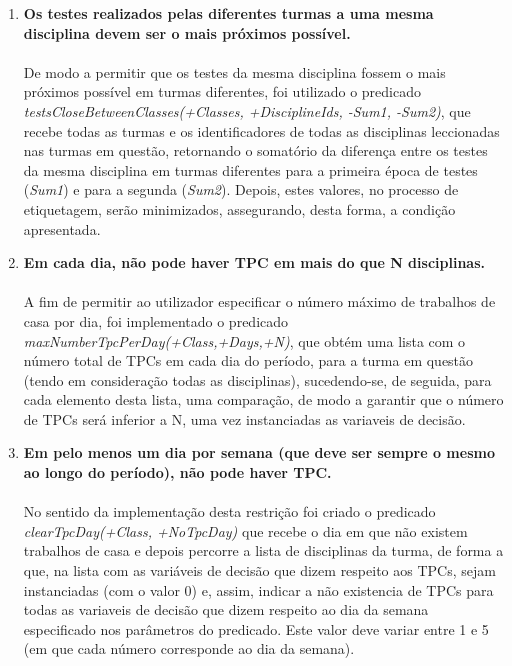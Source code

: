 \documentclass{llncs}
\begin{document}
\begin{enumerate}
	\item \textbf{Os testes realizados pelas diferentes turmas a uma mesma disciplina devem ser o mais próximos possível.} \\\\
		De modo a permitir que os testes da mesma disciplina fossem o mais próximos possível em turmas diferentes, foi utilizado o predicado  \textit{testsCloseBetweenClasses(+Classes, +DisciplineIds, -Sum1, -Sum2)}, 
		que recebe todas as turmas e os identificadores de todas as disciplinas leccionadas nas turmas em questão, retornando o somatório da diferença entre os testes da mesma disciplina em turmas diferentes para a 
		primeira época de testes (\textit{Sum1}) e para a segunda 
		(\textit{Sum2}). Depois, estes valores, no processo de etiquetagem, serão minimizados, assegurando, desta forma, a condição apresentada.
		\\

	\item \textbf{Em cada dia, não pode haver TPC em mais do que N disciplinas.} \\\\
		A fim de permitir ao utilizador especificar o número máximo de trabalhos de casa por dia, foi implementado o predicado \textit{maxNumberTpcPerDay(+Class,+Days,+N)}, que obtém uma lista com o número total de TPCs em cada dia do período, para a turma em questão (tendo em consideração todas as disciplinas), sucedendo-se, de seguida, para cada elemento desta lista, uma comparação, 
		de modo a garantir que o número de TPCs será inferior a N, uma vez instanciadas as variaveis de decisão.
		\\

\newpage

	\item \textbf{Em pelo menos um dia por semana (que deve ser sempre o mesmo ao longo do período), não pode haver TPC.} \\\\
		No sentido da implementação desta restrição foi criado o predicado \textit{clearTpcDay(+Class, +NoTpcDay)} que recebe o dia em que não existem trabalhos de casa e depois percorre a lista de disciplinas da turma, de forma a que, na lista com as variáveis de decisão que dizem respeito aos TPCs, sejam instanciadas (com o valor 0) e, assim, indicar a não existencia de TPCs para todas as variaveis de decisão que dizem respeito ao dia da 
semana especificado nos parâmetros do predicado. Este valor deve variar entre 1 e 5 (em que cada número corresponde ao dia da semana).
		\\


\end{enumerate}
\end{document}
